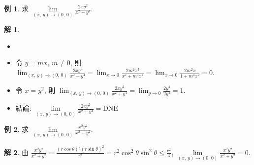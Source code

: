 \documentclass[12pt]{extarticle}
\newcommand{\ds}{\displaystyle}
\theoremstyle{definition}
\newtheorem*{ex}{例}
\newtheorem*{sol}{解}
\begin{document}
\begin{ex}
  求 $\ds\lim\limits_{(x,\,y)\to (0,\,0)}\frac{2xy^2}{x^2+y^4}$. 
\end{ex}
\begin{sol}
  \begin{itemize}\setlength{\itemsep}{0pt}
    \item[]
    \item 令 $y = mx$, $m\ne 0$, 則 $\ds\lim_{(x,\,y)\to (0,\,0)}\frac{2xy^2}{x^2+y^4} = \lim_{x\to 0}\frac{2m^2x^3}{x^2 + m^4 x^4} = \lim_{x\to 0}\frac{2m^2x}{1 + m^4 x^2} = 0$. 
    \item 令 $x = y^2$, 則 $\ds\lim_{(x,\,y)\to (0,\,0)}\frac{2xy^2}{x^2+y^4} = \lim_{y\to 0}\frac{2y^4}{2y^4} = 1$. 
    \item 結論: $\ds\lim\limits_{(x,\,y)\to(0,\,0)}\frac{2xy^2}{x^2+y^4} = \text{DNE}$
  \end{itemize}
\end{sol}

\begin{ex}
  求 $\ds\lim\limits_{(x,\,y)\to (0,\,0)}\frac{x^2y^2}{x^2 + y^2}$. 
\end{ex}
\begin{sol}
  由 $\ds\frac{x^2y^2}{x^2 + y^2} = \frac{(r\cos\theta)^2(r\sin\theta)^2}{r^2} = r^2\cos^2\theta\sin^2\theta\leqslant\frac{r^2}{4}$, $\ds\lim\limits_{(x,\,y)\to (0,\,0)}\frac{x^2y^2}{x^2 + y^2} = 0$. 
\end{sol}
\end{document}
